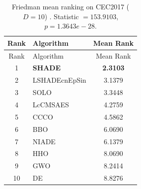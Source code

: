 \begin{center}
\small
\renewcommand{\arraystretch}{1.25}
\begin{longtable}{clc}
\caption{Friedman mean ranking on CEC2017 ($D=10$) . Statistic $=153.9103$, $p=1.3643e-28$.}
\label{tab:friedman_CEC2017_10} \\
\toprule
Rank & Algorithm & Mean Rank \\
\midrule
\endfirsthead
\toprule
Rank & Algorithm & Mean Rank \\
\midrule
\endhead
1 & \textbf{SHADE} & \textbf{2.3103} \\
2 & LSHADEcnEpSin & 3.1379 \\
3 & SOLO & 3.3448 \\
4 & LcCMSAES & 4.2759 \\
5 & CCCO & 4.5862 \\
6 & BBO & 6.0690 \\
7 & NIADE & 6.1379 \\
8 & HHO & 8.0690 \\
9 & GWO & 8.2414 \\
10 & DE & 8.8276 \\
\bottomrule
\end{longtable}
\end{center}